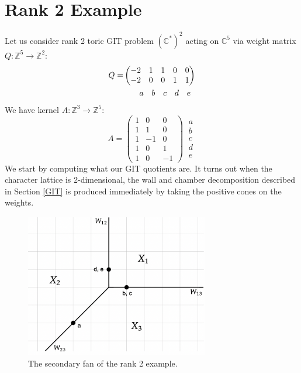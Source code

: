 \documentclass[oneside]{amsart}
\theoremstyle{definition}
\theoremstyle{definition}
\theoremstyle{definition}
\theoremstyle{definition}
\newcommand{\CC}{\mathbb{C}}
\newcommand{\Z}{\mathbb{Z}}
\begin{document}
\section{Rank 2 Example}  
\label{rank2example}
Let us consider rank 2 toric GIT problem $(\CC^*)^2$ acting on $\CC^5$ via weight matrix $Q : \Z^5 \to \Z^2$:
\begin{align*}
    Q =& \begin{pmatrix}
    -2 & 1 & 1 & 0 & 0 \\
    -2 & 0 & 0 & 1 & 1
    \end{pmatrix} 
    \\
    & \hspace{0.7cm}\begin{matrix}
    a & b & c & d & e 
    \end{matrix}
\end{align*}
We have kernel $A : \Z^3 \to \Z^5$:
\begin{equation*}
    A = 
    \begin{pmatrix}
    1 & 0 & 0 \\
    1 & 1 & 0 \\
    1 & -1 & 0 \\
    1 & 0 & 1 \\
    1 & 0 & -1
    \end{pmatrix}
    \:
    \begin{matrix}
    a \\
    b \\
    c \\
    d\\
    e
    \end{matrix}
\end{equation*}
We start by computing what our GIT quotients are. It turns out when the character lattice is 2-dimensional, the wall and chamber decomposition described in Section \ref{GIT} is produced immediately by taking the positive cones on the weights. 
\begin{figure}[!h]
    \centering
    \includegraphics[width=8cm]{rank2exmp/secondaryfan1.png}
    \caption{The secondary fan of the rank 2 example.}
    \label{secondaryrank2}
\end{figure}\\
\end{document}
